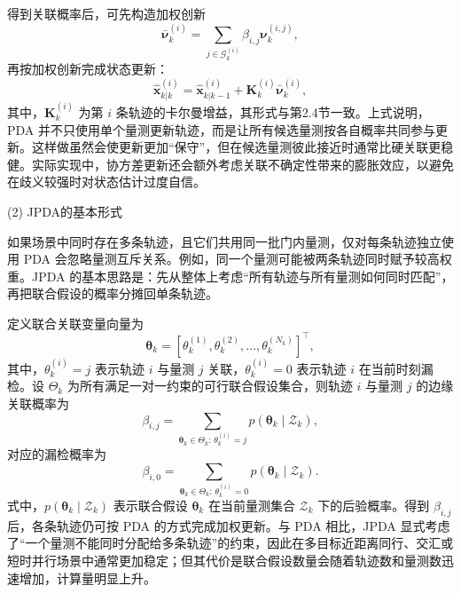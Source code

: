 \documentclass{xdupgthesis}
\begin{document}
得到关联概率后，可先构造加权创新
\begin{equation}
	\bar{\boldsymbol{\nu}}^{(i)}_k
	=
	\sum_{j\in\mathcal{G}^{(i)}_k}
	\beta_{i,j}\boldsymbol{\nu}^{(i,j)}_k,
\end{equation}
再按加权创新完成状态更新：
\begin{equation}
	\hat{\mathbf{x}}^{(i)}_{k|k}
	=
	\hat{\mathbf{x}}^{(i)}_{k|k-1}
	+
	\mathbf{K}^{(i)}_k\bar{\boldsymbol{\nu}}^{(i)}_k,
\end{equation}
其中，$\mathbf{K}^{(i)}_k$ 为第 $i$ 条轨迹的卡尔曼增益，其形式与第2.4节一致。上式说明，PDA 并不只使用单个量测更新轨迹，而是让所有候选量测按各自概率共同参与更新。这样做虽然会使更新更加“保守”，但在候选量测彼此接近时通常比硬关联更稳健。实际实现中，协方差更新还会额外考虑关联不确定性带来的膨胀效应，以避免在歧义较强时对状态估计过度自信。


\textnormal{(2) JPDA的基本形式}\par\vspace{0.3\baselineskip}

如果场景中同时存在多条轨迹，且它们共用同一批门内量测，仅对每条轨迹独立使用 PDA 会忽略量测互斥关系。例如，同一个量测可能被两条轨迹同时赋予较高权重。JPDA 的基本思路是：先从整体上考虑“所有轨迹与所有量测如何同时匹配”，再把联合假设的概率分摊回单条轨迹。

定义联合关联变量向量为
\begin{equation}
	\boldsymbol{\theta}_k
	=
	\left[
	\theta_k^{(1)},\theta_k^{(2)},\ldots,\theta_k^{(N_k)}
	\right]^{\top},
\end{equation}
其中，$\theta_k^{(i)}=j$ 表示轨迹 $i$ 与量测 $j$ 关联，$\theta_k^{(i)}=0$ 表示轨迹 $i$ 在当前时刻漏检。设 $\Theta_k$ 为所有满足一对一约束的可行联合假设集合，则轨迹 $i$ 与量测 $j$ 的边缘关联概率为
\begin{equation}
	\beta_{i,j}
	=
	\sum_{\boldsymbol{\theta}_k\in\Theta_k:\,\theta_k^{(i)}=j}
	p(\boldsymbol{\theta}_k\mid \mathcal{Z}_k),
\end{equation}
对应的漏检概率为
\begin{equation}
	\beta_{i,0}
	=
	\sum_{\boldsymbol{\theta}_k\in\Theta_k:\,\theta_k^{(i)}=0}
	p(\boldsymbol{\theta}_k\mid \mathcal{Z}_k).
\end{equation}
式中，$p(\boldsymbol{\theta}_k\mid \mathcal{Z}_k)$ 表示联合假设 $\boldsymbol{\theta}_k$ 在当前量测集合 $\mathcal{Z}_k$ 下的后验概率。得到 $\beta_{i,j}$ 后，各条轨迹仍可按 PDA 的方式完成加权更新。与 PDA 相比，JPDA 显式考虑了“一个量测不能同时分配给多条轨迹”的约束，因此在多目标近距离同行、交汇或短时并行场景中通常更加稳定；但其代价是联合假设数量会随着轨迹数和量测数迅速增加，计算量明显上升。
\end{document}
